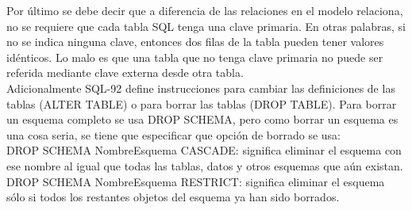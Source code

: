 \documentclass[preprint,12pt]{elsarticle}
\begin{document}
Por último se debe decir que a diferencia de las relaciones en el modelo relaciona, no se requiere que cada tabla SQL tenga una clave primaria. En otras palabras, si no se indica ninguna clave, entonces dos filas de la tabla pueden tener valores idénticos. Lo malo es que una tabla que no tenga clave primaria no puede ser referida mediante clave externa desde otra tabla. \\ Adicionalmente SQL-92 define instrucciones para cambiar las definiciones de las tablas (ALTER TABLE) o para borrar las tablas (DROP TABLE). Para borrar un esquema completo se usa DROP SCHEMA, pero como borrar un esquema es una cosa seria, se tiene que especificar que opción de borrado se usa: \\ DROP SCHEMA NombreEsquema CASCADE: significa eliminar el esquema con ese nombre al igual que todas las tablas, datos y otros esquemas que aún existan. DROP SCHEMA NombreEsquema RESTRICT: significa eliminar el esquema sólo si todos los restantes objetos del esquema ya han sido borrados.
\end{document}
